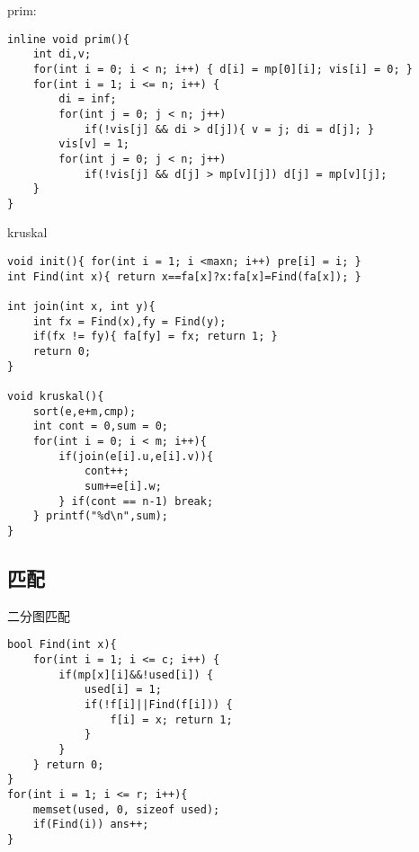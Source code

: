 prim:

\begin{lstlisting}
inline void prim(){
    int di,v;
    for(int i = 0; i < n; i++) { d[i] = mp[0][i]; vis[i] = 0; }
    for(int i = 1; i <= n; i++) {
        di = inf;
        for(int j = 0; j < n; j++) 
            if(!vis[j] && di > d[j]){ v = j; di = d[j]; }
        vis[v] = 1;
        for(int j = 0; j < n; j++)
            if(!vis[j] && d[j] > mp[v][j]) d[j] = mp[v][j];
    }
}
\end{lstlisting}
kruskal
\begin{lstlisting}
void init(){ for(int i = 1; i <maxn; i++) pre[i] = i; }
int Find(int x){ return x==fa[x]?x:fa[x]=Find(fa[x]); }

int join(int x, int y){
    int fx = Find(x),fy = Find(y);
    if(fx != fy){ fa[fy] = fx; return 1; }
    return 0;
}

void kruskal(){
    sort(e,e+m,cmp);
    int cont = 0,sum = 0;
    for(int i = 0; i < m; i++){
        if(join(e[i].u,e[i].v)){
            cont++;
            sum+=e[i].w;
        } if(cont == n-1) break;
    } printf("%d\n",sum);
}
\end{lstlisting}

\subsection{匹配}
二分图匹配
\begin{lstlisting}
bool Find(int x){
    for(int i = 1; i <= c; i++) {
        if(mp[x][i]&&!used[i]) {
            used[i] = 1;
            if(!f[i]||Find(f[i])) {
                f[i] = x; return 1;
            }
        }
    } return 0;
}
for(int i = 1; i <= r; i++){
    memset(used, 0, sizeof used);
    if(Find(i)) ans++;
}
\end{lstlisting}

